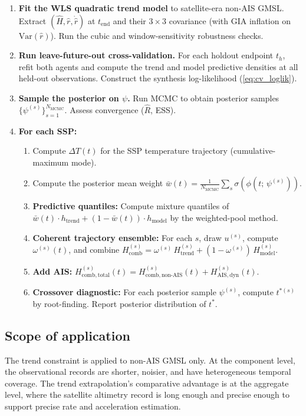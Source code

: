 \documentclass[11pt]{article}
\newcommand{\dT}{\Delta T}
\newcommand{\tend}{t_{\mathrm{end}}}
\begin{document}
\begin{enumerate}
  \item \textbf{Fit the WLS quadratic trend model} to satellite-era non-AIS GMSL.  Extract $(\hat{H}, \hat{r}, \dot{\hat{r}})$ at $\tend$ and their $3 \times 3$ covariance (with GIA inflation on $\mathrm{Var}(\hat{r})$).  Run the cubic and window-sensitivity robustness checks.
  \item \textbf{Run leave-future-out cross-validation.}  For each holdout endpoint $t_h$, refit both agents and compute the trend and model predictive densities at all held-out observations.  Construct the synthesis log-likelihood (\cref{eq:cv_loglik}).
  \item \textbf{Sample the posterior on $\psi$.}  Run MCMC to obtain posterior samples $\{\psi^{(s)}\}_{s=1}^{N_{\mathrm{MCMC}}}$.  Assess convergence ($\hat{R}$, ESS).
  \item \textbf{For each SSP:}
  \begin{enumerate}
    \item Compute $\dT(t)$ for the SSP temperature trajectory (cumulative-maximum mode).
    \item Compute the posterior mean weight $\bar{w}(t) = \frac{1}{N_{\mathrm{MCMC}}} \sum_s \sigma(\phi(t;\,\psi^{(s)}))$.
    \item \textbf{Predictive quantiles:} Compute mixture quantiles of $\bar{w}(t) \cdot h_{\mathrm{trend}} + (1 - \bar{w}(t)) \cdot h_{\mathrm{model}}$ by the weighted-pool method.
    \item \textbf{Coherent trajectory ensemble:} For each $s$, draw $u^{(s)}$, compute $\omega^{(s)}(t)$, and combine $H_{\mathrm{comb}}^{(s)} = \omega^{(s)}\,H_{\mathrm{trend}}^{(s)} + (1 - \omega^{(s)})\,H_{\mathrm{model}}^{(s)}$.
    \item \textbf{Add AIS:} $H_{\mathrm{comb,total}}^{(s)}(t) = H_{\mathrm{comb,non\text{-}AIS}}^{(s)}(t) + H_{\mathrm{AIS,dyn}}^{(s)}(t)$.
    \item \textbf{Crossover diagnostic:} For each posterior sample $\psi^{(s)}$, compute $t^{*(s)}$ by root-finding.  Report posterior distribution of $t^*$.
  \end{enumerate}
\end{enumerate}

\subsection{Scope of application}

The trend constraint is applied to non-AIS GMSL only.  At the component level, the observational records are shorter, noisier, and have heterogeneous temporal coverage.  The trend extrapolation's comparative advantage is at the aggregate level, where the satellite altimetry record is long enough and precise enough to support precise rate and acceleration estimation.
\end{document}
